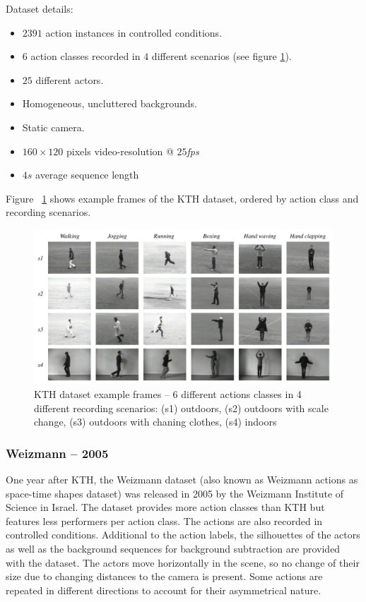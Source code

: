 Dataset details: \cite{schuldt_recognizing_2004}
\begin{itemize}
    \item $2391$ action instances in controlled conditions.
    \item $6$ action classes recorded in $4$ different scenarios (see figure \ref{fig:kth_example}).
    \item $25$ different actors.
    \item Homogeneous, uncluttered backgrounds.
    \item Static camera.
    \item $160 \times 120$ pixels video-resolution @ $25$\textit{fps}
    \item $4s$ average sequence length
\end{itemize}

Figure ~\ref{fig:kth_example} shows example frames of the KTH dataset, ordered by action class and recording scenarios.

\begin{figure}[H]
    \centering
    \includegraphics[width=\textwidth]{img_datasets/kth_example}
    \caption{KTH dataset example frames -- 6 different actions classes in 4 different recording scenarios: (s1) outdoors, (s2) outdoors with scale change, (s3) outdoors with chaning clothes, (s4) indoors \cite{schuldt_recognizing_2004}}
    \label{fig:kth_example}
\end{figure}


\subsubsection{Weizmann -- 2005}
One year after KTH, the Weizmann dataset \cite{blank_actions_2005} (also known as Weizmann actions as space-time shapes dataset) was released in 2005 by the Weizmann Institute of Science in Israel.
The dataset provides more action classes than KTH but features less performers per action class.
The actions are also recorded in controlled conditions.
Additional to the action labels, the silhouettes of the actors as well as the background sequences for background subtraction are provided with the dataset.
The actors move horizontally in the scene, so no change of their size due to changing distances to the camera is present.
Some actions are repeated in different directions to account for their asymmetrical nature.

